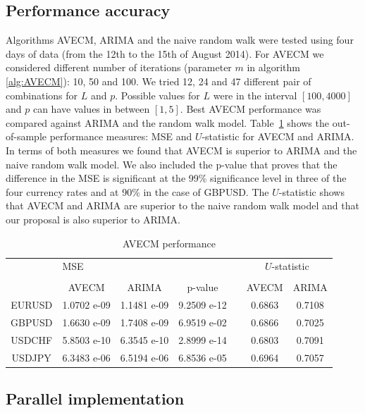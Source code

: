 \subsection{Performance accuracy} \label{sec:performance}

Algorithms AVECM, ARIMA and the naive random walk were tested using four days of data (from the 12th to the 15th of August 2014).
For AVECM we considered different number of iterations (parameter $m$ in algorithm \ref{alg:AVECM}): 10, 50 and 100. We tried 12, 24 and 47 different pair of combinations for $L$ and $p$. Possible values for $L$ were in the interval $[100,4000]$ and $p$ can have values in between $[1,5]$. Best AVECM performance was compared against ARIMA and the random walk model.
Table~\ref{tab:stats} shows the out-of-sample performance measures: MSE and $U$-statistic for AVECM and ARIMA. In terms of both measures we found that AVECM is superior to ARIMA and the naive random walk model. We also included the p-value that proves that the difference in the MSE is significant at the 99\% significance level in three of the four currency rates and at 90\% in the case of GBPUSD. The $U$-statistic shows that AVECM and ARIMA are superior to the naive random walk model and that our proposal is also superior to ARIMA.

\begin{table}[!htbp]
\caption{AVECM performance}
\label{tab:stats}
\begin{center}
\begin{tabular}{ccccccc}

& \multicolumn{3}{l}{MSE} & &
\multicolumn{2}{c}{$U$-statistic} \\ 
\hhline{~---~--} \\
 &
AVECM & ARIMA & p-value & &
AVECM & ARIMA \\ 

\hline
 EURUSD & 1.0702 e-09 & 1.1481 e-09 &  9.2509 e-12 & & 0.6863 & 0.7108\\
 GBPUSD & 1.6630 e-09 & 1.7408 e-09 &  6.9519 e-02 & & 0.6866 & 0.7025\\
 USDCHF & 5.8503 e-10 & 6.3545 e-10 &  2.8999 e-14 & & 0.6803 & 0.7091\\
 USDJPY  & 6.3483 e-06 & 6.5194 e-06 &  6.8536 e-05 & & 0.6964 & 0.7057\\
 \end{tabular}
 \end{center}
\end{table}

\subsection{Parallel implementation} \label{sec:parallel}

